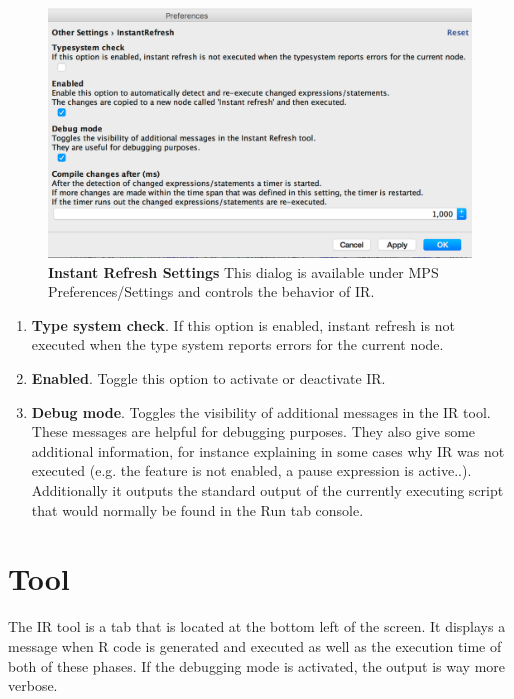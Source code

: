 \begin{figure}[h!tbp]
  \centering
  \includegraphics[width=\figWidthWide]{figures/IRPreferences-2.png}
\caption[Instant Refresh Settings]{\textbf{Instant Refresh Settings} This dialog is available under MPS Preferences/Settings and controls the behavior of IR.}
\end{figure}

\begin{enumerate}
	\item \textbf{Type system check}. 
	If this option is enabled, instant refresh is not executed when the type system 	reports errors for the current node.
	\item \textbf{Enabled}. Toggle this option to activate or deactivate IR.
	\item \textbf{Debug mode}.
	Toggles the visibility of additional messages in the IR tool. These messages 			are helpful for debugging purposes.
	They also give some additional information, for instance explaining in some cases why IR was not 	 executed (e.g. the feature is not enabled, a pause expression is active..).
	Additionally it outputs the standard output of the currently executing script 	that would normally be found in the Run tab console.
\end{enumerate}

\section{Tool}
The IR tool is a tab that is located at the bottom left of the screen. It displays a message when R code is generated and executed as
well as the execution time of both of these phases. If the debugging mode is activated, the output is way more verbose.

